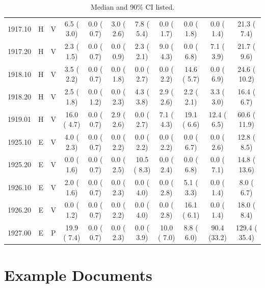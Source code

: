 \documentclass[11pt,twocolumn]{article}
\begin{document}
\begin{table}[]
{\begin{tabular}{ccccccccccc}
1917.10 & H & V &  6.5 ( 3.0) &  0.0 ( 0.7) &  3.0 ( 2.6) &  7.8 ( 5.4) &  0.0 ( 1.7) &  0.0 ( 1.8) &  0.0 ( 1.4) &  21.3 (  7.4) \\
1917.20 & H & V &  2.3 ( 1.5) &  0.0 ( 0.7) &  0.0 ( 0.9) &  2.3 ( 2.1) &  9.0 ( 4.3) &  0.0 ( 6.8) &  7.1 ( 3.9) &  21.7 (  9.6) \\
1918.10 & H & V &  3.5 ( 2.2) &  0.0 ( 0.7) &  0.0 ( 1.8) &  0.0 ( 2.7) &  0.0 ( 2.2) & 14.6 ( 5.7) &  0.0 ( 6.9) &  24.6 ( 10.2) \\
1918.20 & H & V &  2.5 ( 1.8) &  0.0 ( 1.2) &  0.0 ( 2.3) &  4.3 ( 3.8) &  2.9 ( 2.6) &  2.2 ( 2.1) &  3.3 ( 3.0) &  16.4 (  6.7) \\
1919.01 & H & V & 16.0 ( 4.7) &  0.0 ( 0.7) &  2.9 ( 2.6) &  0.0 ( 2.7) &  7.1 ( 4.3) & 19.1 ( 6.6) & 12.4 ( 6.5) &  60.6 ( 11.9) \\
1925.10 & E & V &  4.0 ( 2.3) &  0.0 ( 0.7) &  0.0 ( 2.2) &  0.0 ( 2.2) &  0.0 ( 2.2) &  0.0 ( 6.7) &  0.0 ( 2.6) &  12.8 (  8.5) \\
1925.20 & E & V &  0.0 ( 1.6) &  0.0 ( 0.7) &  0.0 ( 2.5) & 10.5 ( 8.3) &  0.0 ( 2.4) &  0.0 ( 6.8) &  0.0 ( 7.1) &  14.8 ( 13.6) \\
1926.10 & E & V &  2.0 ( 1.6) &  0.0 ( 0.7) &  0.0 ( 2.3) &  0.0 ( 4.0) &  0.0 ( 2.8) &  5.1 ( 3.3) &  0.0 ( 1.4) &   8.0 (  6.7) \\
1926.20 & E & V &  0.0 ( 1.2) &  0.0 ( 0.7) &  0.0 ( 2.2) &  0.0 ( 4.0) &  0.0 ( 2.8) & 16.1 ( 6.1) &  0.0 ( 1.4) &  18.0 (  8.4) \\
1927.00 & E & P & 19.9 ( 7.4) &  0.0 ( 0.7) &  0.0 ( 2.3) &  0.0 ( 3.9) & 10.0 ( 7.0) &  8.8 ( 6.0) & 90.4 (33.2) & 129.4 ( 35.4) \\
\bottomrule
\end{tabular}
}
\caption*{Median and 90\% CI listed.}
\label{tbl:allPop}
\end{table}

\section{Example Documents}
\end{document}

